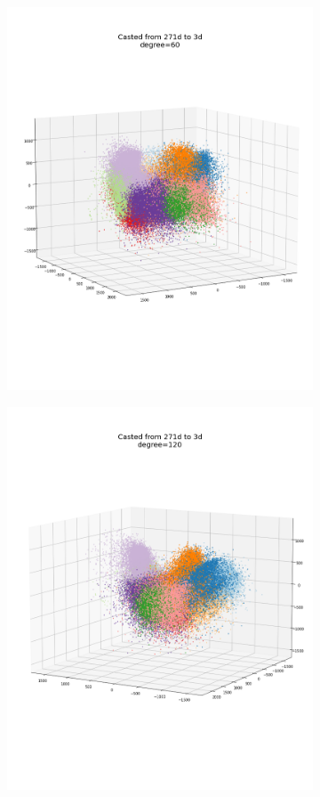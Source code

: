 \documentclass[12pt, a4paper]{article}
\begin{document}
\begin{figure}[h]
\begin{subfigure}{0.3\linewidth}
        \includegraphics[width=\linewidth]{images/q4/h/3dangle60.png}
    \end{subfigure}
    \hfill
    \begin{subfigure}{0.3\linewidth}
        \centering
        \includegraphics[width=\linewidth]{images/q4/h/3dangle120.png}

\end{subfigure}
\end{figure}
\end{document}
